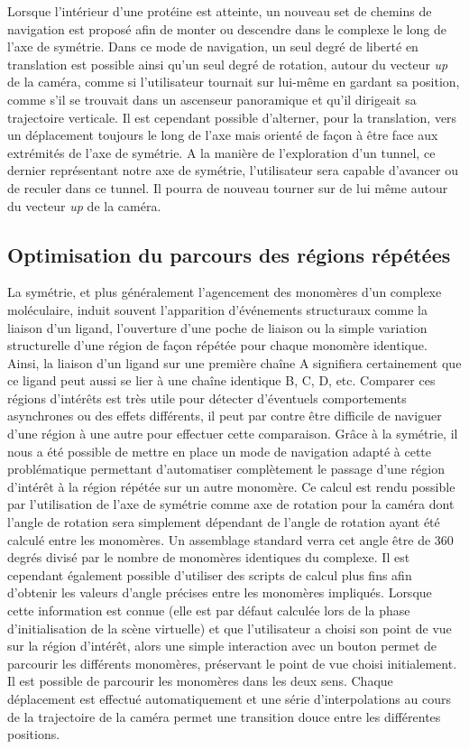 Lorsque l'intérieur d'une protéine est atteinte, un nouveau set de chemins de navigation est proposé afin de monter ou descendre dans le complexe le long de l'axe de symétrie. Dans ce mode de navigation, un seul degré de liberté en translation est possible ainsi qu'un seul degré de rotation, autour du vecteur \textit{up} de la caméra, comme si l'utilisateur tournait sur lui-même en gardant sa position, comme s'il se trouvait dans un ascenseur panoramique et qu'il dirigeait sa trajectoire verticale. Il est cependant possible d'alterner, pour la translation, vers un déplacement toujours le long de l'axe mais orienté de façon à être face aux extrémités de l'axe de symétrie. A la manière de l'exploration d'un tunnel, ce dernier représentant notre axe de symétrie, l'utilisateur sera capable d'avancer ou de reculer dans ce tunnel. Il pourra de nouveau tourner sur de lui même autour du vecteur \textit{up} de la caméra.

\subsection{Optimisation du parcours des régions répétées}

La symétrie, et plus généralement l'agencement des monomères d'un complexe moléculaire, induit souvent l'apparition d'événements structuraux comme la liaison d'un ligand, l'ouverture d'une poche de liaison ou la simple variation structurelle d'une région de façon répétée pour chaque monomère identique. Ainsi, la liaison d'un ligand sur une première chaîne A signifiera certainement que ce ligand peut aussi se lier à une chaîne identique B, C, D, etc. Comparer ces régions d'intérêts est très utile pour détecter d'éventuels comportements asynchrones ou des effets différents, il peut par contre être difficile de naviguer d'une région à une autre pour effectuer cette comparaison. Grâce à la symétrie, il nous a été possible de mettre en place un mode de navigation adapté à cette problématique permettant d'automatiser complètement le passage d'une région d'intérêt à la région répétée sur un autre monomère. Ce calcul est rendu possible par l'utilisation de l'axe de symétrie comme axe de rotation pour la caméra dont l'angle de rotation sera simplement dépendant de l'angle de rotation ayant été calculé entre les monomères. Un assemblage standard verra cet angle être de 360 degrés divisé par le nombre de monomères identiques du complexe. Il est cependant également possible d'utiliser des scripts de calcul plus fins afin d'obtenir les valeurs d'angle précises entre les monomères impliqués. Lorsque cette information est connue (elle est par défaut calculée lors de la phase d'initialisation de la scène virtuelle) et que l'utilisateur a choisi son point de vue sur la région d'intérêt, alors une simple interaction avec un bouton permet de parcourir les différents monomères, préservant le point de vue choisi initialement. Il est possible de parcourir les monomères dans les deux sens. Chaque déplacement est effectué automatiquement et une série d'interpolations au cours de la trajectoire de la caméra permet une transition douce entre les différentes positions.

